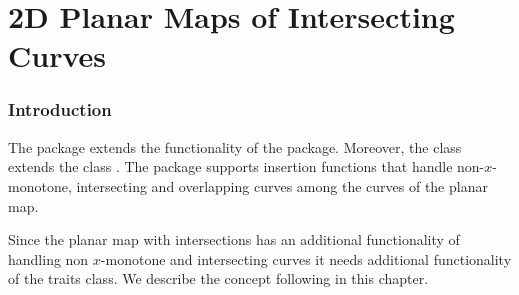 



\chapter{2D Planar Maps of Intersecting Curves}

\subsection*{Introduction}

  The  package extends the
  functionality of the  package. Moreover, the class
   extends the class
  . The  package
  supports insertion functions that handle non-$x$-monotone,
  intersecting and overlapping curves among the curves of
  the planar map.

  Since the planar map with intersections has an additional
  functionality of handling non $x$-monotone and intersecting curves
  it needs additional functionality of the traits class. We describe
  the  concept following in
  this chapter. 

